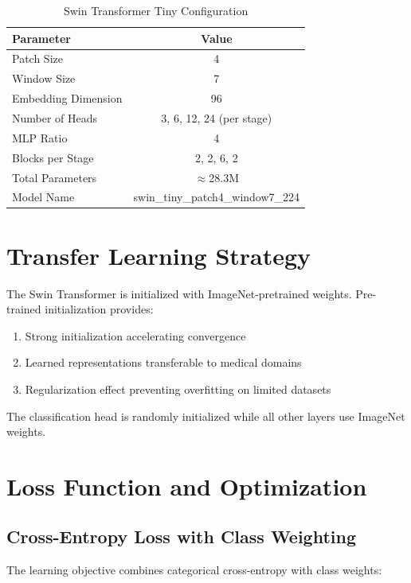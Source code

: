 \begin{table}[H]
\centering
\caption{Swin Transformer Tiny Configuration}
\label{tab:swin_config}
\begin{tabular}{|l|c|}
\hline
\textbf{Parameter} & \textbf{Value} \\
\hline
Patch Size & 4 \\
Window Size & 7 \\
Embedding Dimension & 96 \\
Number of Heads & 3, 6, 12, 24 (per stage) \\
MLP Ratio & 4 \\
Blocks per Stage & 2, 2, 6, 2 \\
Total Parameters & $\approx$28.3M \\
Model Name & swin\_tiny\_patch4\_window7\_224 \\
\hline
\end{tabular}
\end{table}

\section{Transfer Learning Strategy}

The Swin Transformer is initialized with ImageNet-pretrained weights. Pre-trained initialization provides:

\begin{enumerate}
    \item Strong initialization accelerating convergence
    \item Learned representations transferable to medical domains
    \item Regularization effect preventing overfitting on limited datasets
\end{enumerate}

The classification head is randomly initialized while all other layers use ImageNet weights.

\section{Loss Function and Optimization}

\subsection{Cross-Entropy Loss with Class Weighting}

The learning objective combines categorical cross-entropy with class weights:

